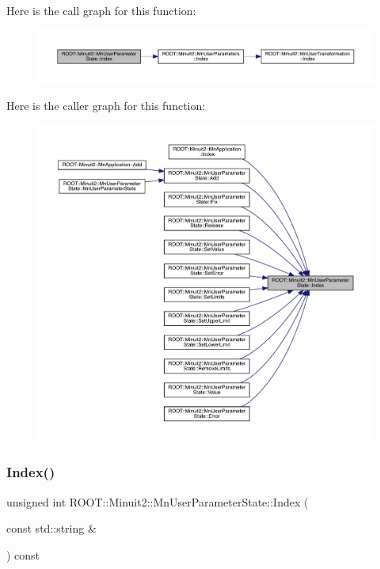 Here is the call graph for this function\+:\nopagebreak
\begin{figure}[H]
\begin{center}
\leavevmode
\includegraphics[width=350pt]{d3/de0/classROOT_1_1Minuit2_1_1MnUserParameterState_a2301d51ec17effc44792821d4482cb14_cgraph}
\end{center}
\end{figure}
Here is the caller graph for this function\+:\nopagebreak
\begin{figure}[H]
\begin{center}
\leavevmode
\includegraphics[width=350pt]{d3/de0/classROOT_1_1Minuit2_1_1MnUserParameterState_a2301d51ec17effc44792821d4482cb14_icgraph}
\end{center}
\end{figure}
\mbox{\label{classROOT_1_1Minuit2_1_1MnUserParameterState_a2301d51ec17effc44792821d4482cb14}} 
\subsubsection{\texorpdfstring{Index()}{Index()}\hspace{0.1cm}{\footnotesize\ttfamily [2/2]}}
{\footnotesize\ttfamily unsigned int R\+O\+O\+T\+::\+Minuit2\+::\+Mn\+User\+Parameter\+State\+::\+Index (\begin{DoxyParamCaption}\item[{const std\+::string \&}]{ }\end{DoxyParamCaption}) const}

